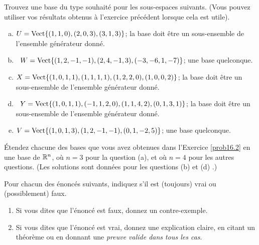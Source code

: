 \begin{prob}
\end{prob} \begin{prob} \label{prob16.2}  Trouvez une base du type souhaité pour les sous-espaces suivants. (Vous pouvez utiliser vos résultats obtenus à l'exercice précédent lorsque cela est utile).
\medskip
\begin{enumerate}[(a)]
 
\item $U=\sp{(1,1,0), (2,0,3), (3,1,3)}$; la base doit \^etre un sous-ensemble de l'ensemble g\'en\'erateur donn\'e.
 
 
\medskip
\item\sov~$W=\sp{(1,2,-1,-1),(2,4,-1,3),(-3,-6,1,-7)}$; une base quelconque.
\medskip
 
\item $X=\sp{(1,0,1,1),(1,1,1,1),(1,2,2,0),(1,0,0,2) }$; la base doit \^etre un sous-ensemble de l'ensemble g\'en\'erateur donn\'e.
\medskip
  
\item\sov~$Y=\sp{(1,0,1,1), (-1,1,2,0), (1,1,4,2), (0,1,3,1)}$; la base doit \^etre un sous-ensemble de l'ensemble g\'en\'erateur donn\'e.
\medskip
 
\item $V=\sp{(1,0,1,3),(1,2,-1,-1),( 0,1,-2,5)}$; une base quelconque.
\medskip
 
\end{enumerate}

\end{prob} \begin{prob} \label{prob16.3} Étendez chacune des bases que vous avez obtenues dans l'Exercice \ref{prob16.2} en une base de $\R^n$, où $n=3$ pour la question (a), et où $n=4$ pour les autres questions. (Les solutions sont données pour les questions (b) \sov et (d) \sov.)

\end{prob} \begin{prob} \label{prob16.4} Pour chacun des énoncés suivants, indiquez s'il est (toujours) vrai
ou (possiblement) faux.   
   \smallskip    
\begin{enumerate}[$\bullet$]
\item Si vous dites que l'\'enonc\'e est faux, donnez un contre-exemple.   
\item Si vous dites que l'\'enonc\'e est vrai, donnez une explication claire, en citant un théorème ou en donnant une {\it preuve valide dans tous les cas}. 
\end{enumerate}


\end{prob}
